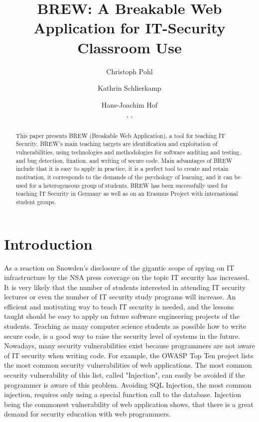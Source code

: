 \documentclass{llncs}
\begin{document}
\title{BREW: A Breakable Web Application for IT-Security Classroom Use}
\author{Christoph Pohl \and Kathrin Schlierkamp \and Hans-Joachim Hof
\\ , , }
\maketitle

\begin{abstract}
This paper presents BREW (Breakable Web Application), a tool for teaching IT Security. BREW's main teaching targets are identification and exploitation of vulnerabilities, using technologies and methodologies for software auditing and testing, and bug detection, fixation, and writing of secure code. Main advantages of BREW include that it is easy to apply in practice, it is a perfect tool to create and retain motivation, it corresponds to the demands of the psychology of learning, and it can be used for a heterogeneous group of students. BREW has been successfully used for teaching IT Security in Germany as well as on an Erasmus Project with international student groups.
\end{abstract}

\section{Introduction}
As a reaction on Snowden's disclosure of the gigantic scope of spying on IT infrastructure by the NSA press coverage on the topic IT security has increased. It is very likely that the number of students interested in attending IT security lectures or even the number of IT security study programs will increase.
An efficient and motivating way to teach IT security is needed, and the lessons taught should be easy to apply on future software engineering projects of the students.
Teaching as many computer science students as possible how to write secure code, is a good way to raise the security level of systems in the future. Nowadays, many security vulnerabilities exist because programmers are not aware of IT security when writing code.
For example, the   OWASP Top Ten project \cite{owasptopten2013} lists the most common security vulnerabilities of web applications.
The most common security vulnerability of this list, called "Injection", can easily be avoided if the programmer is aware of this problem.
Avoiding SQL Injection, the most common injection, requires only using a special function call to the database.
Injection being the commonest vulnerability of web application shows, that there is a great demand for security education with web programmers.
\end{document}
